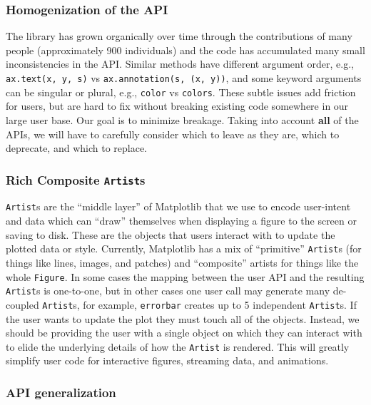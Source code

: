 \documentclass[11pt]{article}  %
\begin{document}
\subsubsection{Homogenization of the API}

The library has grown organically over time through the contributions
of many people (approximately 900 individuals) and the code has
accumulated many small inconsistencies in the API.  Similar methods
have different argument order, e.g., \texttt{ax.text(x, y, s)} vs
\texttt{ax.annotation(s, (x, y))}, and some keyword arguments can be
singular or plural, e.g., \texttt{color} vs \texttt{colors}.  These
subtle issues add friction for users, but are hard to fix without
breaking existing code somewhere in our large user base.
Our goal is to minimize breakage.  Taking into account
\textbf{all} of the APIs, we will have to carefully consider
which to leave as they are, which to deprecate, and which to
replace.


\subsubsection{Rich Composite \texttt{Artist}s}

\texttt{Artist}s are the ``middle layer'' of Matplotlib that we use to
encode user-intent and data which can ``draw'' themselves when
displaying a figure to the screen or saving to disk.  These are the
objects that users interact with to update the plotted data or style.
Currently, Matplotlib has a mix of ``primitive'' \texttt{Artist}s (for
things like lines, images, and patches) and ``composite'' artists for
things like the whole \texttt{Figure}.  In some cases the mapping
between the user API and the resulting \texttt{Artist}s is one-to-one,
but in other cases one user call may generate many de-coupled
\texttt{Artist}s, for example, \texttt{errorbar} creates up to 5
independent \texttt{Artist}s.  If the user wants to update the plot
they must touch all of the objects.  Instead, we should be providing
the user with a single object on which they can interact with to elide
the underlying details of how the \texttt{Artist} is rendered.  This
will greatly simplify user code for interactive figures, streaming
data, and animations.


\subsubsection{API generalization}
\end{document}
